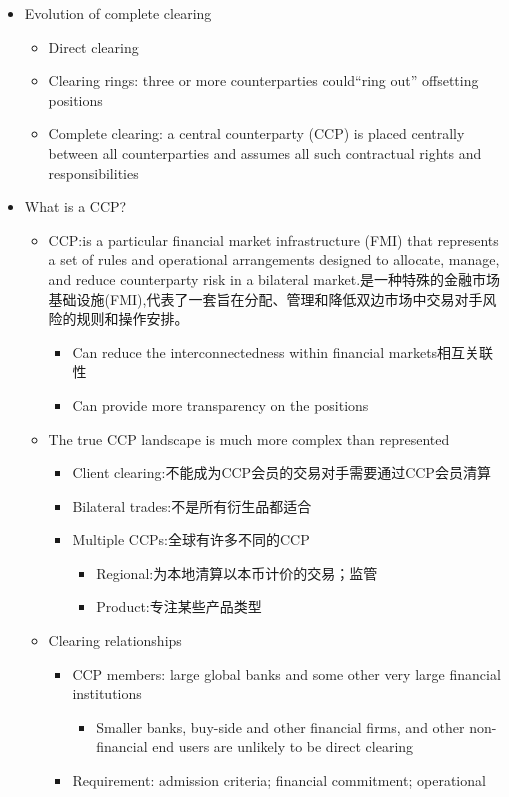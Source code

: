 \begin{itemize}
    \item Evolution of complete clearing
    \begin{itemize}
    \item Direct clearing   
    \item Clearing rings: three or more counterparties could“ring out” offsetting positions
    \item Complete clearing: a central counterparty (CCP) is placed centrally between all counterparties and assumes all such contractual rights and responsibilities
    \end{itemize}

\item What is a CCP?
\begin{itemize}
    \item CCP:is a particular financial market infrastructure (FMI) that represents a set of rules and operational arrangements designed to allocate, manage, and reduce counterparty risk in a bilateral market.是一种特殊的金融市场基础设施(FMI),代表了一套旨在分配、管理和降低双边市场中交易对手风
    险的规则和操作安排。
\begin{itemize}
    \item Can reduce the interconnectedness within financial
    markets相互关联性
    \item Can provide more transparency on the positions
\end{itemize}
\item The true CCP landscape is much more complex than
represented
\begin{itemize}
\item Client clearing:不能成为CCP会员的交易对手需要通过CCP会员清算
\item Bilateral trades:不是所有衍生品都适合
\item Multiple CCPs:全球有许多不同的CCP
\begin{itemize}
\item Regional:为本地清算以本币计价的交易；监管
\item Product:专注某些产品类型
\end{itemize}

\end{itemize}

  \item Clearing relationships
  \begin{itemize}
  \item CCP members: large global banks and some other very
  large financial institutions
  \begin{itemize}
      \item Smaller banks, buy-side and other financial firms, and other non-financial end users are unlikely to be direct clearing
  \end{itemize}
  \item Requirement: admission criteria; financial commitment;
  operational
\end{itemize}


\end{itemize}
\end{itemize}
